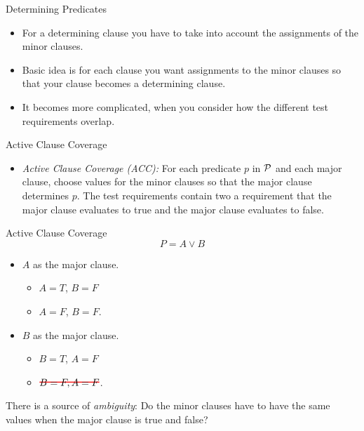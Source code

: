 \documentclass{beamer}
\newcommand{\predset}{{\cal P}}
\newcommand\hcancel[2][red]{\setbox0=\hbox{$#2$}%
\rlap{\raisebox{.45\ht0}{\textcolor{#1}{\rule{\wd0}{1pt}}}}#2}
\begin{document}
\begin{frame}{Determining Predicates}
    
  \begin{itemize}
  \item For a determining clause you have to take into account the
    assignments of the minor clauses.

  \item Basic idea is for each clause you want assignments to the minor
clauses so that your clause becomes a determining clause.
\item It becomes more complicated, when you consider how the different
  test requirements overlap.
  \end{itemize} 
\end{frame}
\begin{frame}{Active Clause Coverage}
  \begin{itemize}
  \item {\em Active Clause Coverage (ACC):} For each predicate $p$ in
    $\predset$ and each major clause, choose values for the  minor
    clauses so that the major clause determines $p$. The test
    requirements contain two a requirement that the major clause
    evaluates to true and the major clause evaluates to false.
  \end{itemize}

  
\end{frame}
\begin{frame}{Active Clause Coverage}
\[
 P = A \lor B 
\]
  \begin{itemize}
  \item $A$ as the major clause.
    \begin{itemize}
    \item $A=T$, $B=F$
    \item $A=F$, $B=F$.
    \end{itemize}
  \item $B$ as the major clause.
    \begin{itemize}
    \item $B=T$, $A=F$
    \item $\hcancel{B=F, A=F}$.
    \end{itemize}
  \end{itemize}
 There is a source of {\em ambiguity}: Do the minor clauses have to
 have the same values when the major clause is true and false?
\end{frame}
\end{document}
